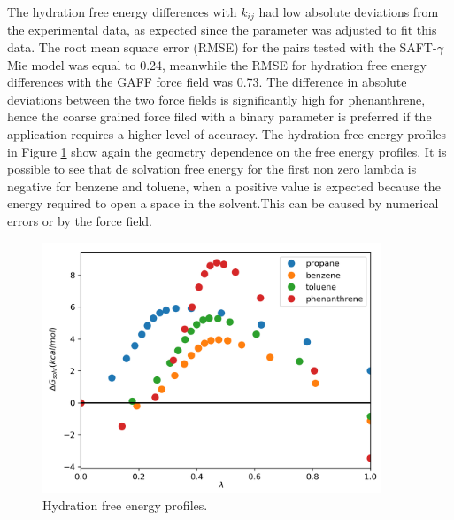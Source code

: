 The hydration free energy differences with $k_{ij}$ had low absolute deviations from the experimental data, as expected since the parameter was adjusted to fit this data. The root mean square error (RMSE) for the pairs tested with the SAFT-$\gamma$ 	Mie model was equal to 0.24, meanwhile the RMSE for hydration free energy differences with the GAFF force field \cite{PMID:24928188} was 0.73. The difference in absolute deviations between the two force fields is significantly high for phenanthrene, hence the coarse grained force filed with a binary parameter is preferred if the application requires a higher level of accuracy. The hydration free energy profiles in Figure \ref{fig:water} show again the geometry  dependence on the free energy profiles. It is possible to see that de solvation free energy for the first non zero lambda is negative for benzene and toluene, when a positive value is expected because the energy required to open a space in the solvent.This can be caused by numerical errors or by the force field. 


\begin{figure}[H]
\centering
\includegraphics[width=0.9\textwidth]{Figures/water}
\caption{Hydration free energy profiles.}
\label{fig:water}
\end{figure}

